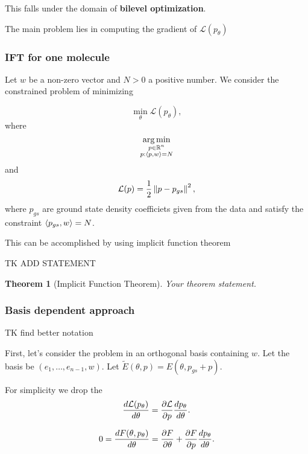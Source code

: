 \documentclass[a4paper,10pt]{report}
\newtheorem{theorem}{Theorem}
\begin{document}
This falls under the domain of \textbf{bilevel optimization}.

The main problem lies in computing the gradient of $\mathcal{L}(p_\theta)$


\subsubsection{IFT for one molecule}
Let $w$ be a non-zero vector and $N>0$ a positive number.
We consider the constrained problem of minimizing

\begin{equation}
 \min_\theta \mathcal{L}(p_\theta),
\end{equation}
where
\begin{equation}
\operatorname*{arg\,min}_{\substack{p \in \mathbb{R}^n \\ p: \langle p, w \rangle=N }}
\end{equation}
and
\begin{equation}
 \mathcal{L}(p) = \frac{1}{2} \left\|p-p_{gs}\right\|^2,
\end{equation}
where $p_{gs}$ are ground state density coefficiets given from the data and satisfy the constraint $\langle p_{gs}, w \rangle = N$.

This can be accomplished by using implicit function theorem

TK ADD STATEMENT
\begin{theorem}[Implicit Function Theorem]
Your theorem statement.
\end{theorem}

\subsubsection{Basis dependent approach}
TK find better notation

First, let's consider the problem in an orthogonal basis containing $w$.
Let the basis be $(e_1,\ldots, e_{n-1}, w)$.
Let $\widetilde{E}(\theta, p) = E(\theta, p_{gs}+ p)$.



For simplicity we drop the
\begin{equation}
 \frac{d\mathcal{L}(p_\theta)}{d \theta} = \frac{\partial \mathcal{L}}{\partial p}\frac{dp_\theta}{d \theta}.
\end{equation}

\begin{equation}
0=\frac{dF(\theta, p_\theta)}{d \theta} = \frac{\partial F}{\partial \theta} + \frac{\partial F}{\partial p} \frac{dp_\theta}{d \theta}.
\end{equation}
\end{document}
